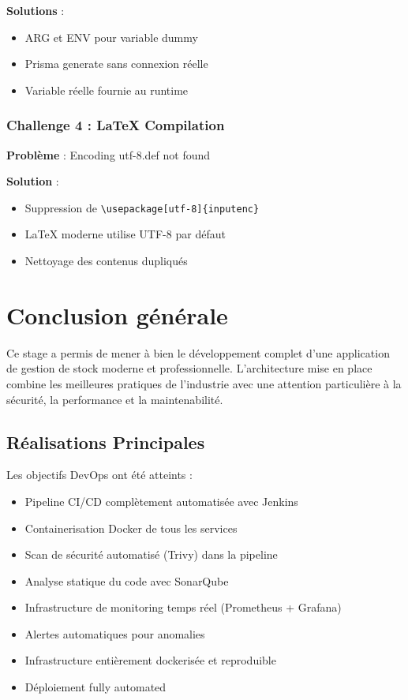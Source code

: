 \documentclass[12pt,a4paper]{report}
\begin{document}
\textbf{Solutions} :
\begin{itemize}
    \item ARG et ENV pour variable dummy
    \item Prisma generate sans connexion réelle
    \item Variable réelle fournie au runtime
\end{itemize}

\subsection{Challenge 4 : LaTeX Compilation}

\textbf{Problème} : Encoding utf-8.def not found

\textbf{Solution} :
\begin{itemize}
    \item Suppression de \verb|\usepackage[utf-8]{inputenc}|
    \item LaTeX moderne utilise UTF-8 par défaut
    \item Nettoyage des contenus dupliqués
\end{itemize}

\newpage

\chapter*{Conclusion générale}

Ce stage a permis de mener à bien le développement complet d'une application de gestion de stock moderne et professionnelle. L'architecture mise en place combine les meilleures pratiques de l'industrie avec une attention particulière à la sécurité, la performance et la maintenabilité.

\section*{Réalisations Principales}

Les objectifs DevOps ont été atteints :

\begin{itemize}
    \item Pipeline CI/CD complètement automatisée avec Jenkins
    \item Containerisation Docker de tous les services
    \item Scan de sécurité automatisé (Trivy) dans la pipeline
    \item Analyse statique du code avec SonarQube
    \item Infrastructure de monitoring temps réel (Prometheus + Grafana)
    \item Alertes automatiques pour anomalies
    \item Infrastructure entièrement dockerisée et reproduible
    \item Déploiement fully automated
\end{itemize}
\end{document}
